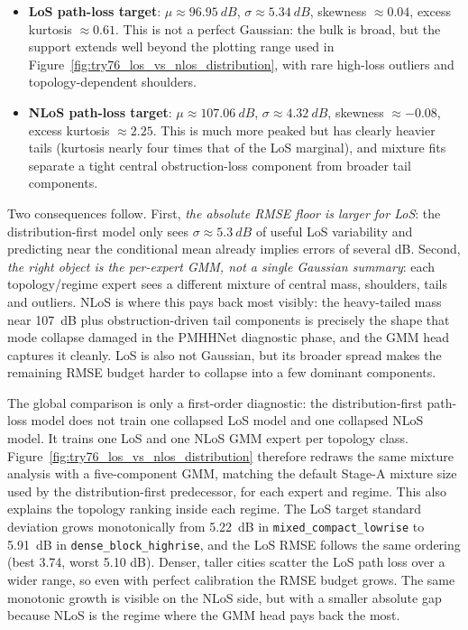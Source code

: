 \begin{itemize}
  \item \textbf{LoS path-loss target}: $\mu \approx \SI{96.95}{dB}$,
  $\sigma \approx \SI{5.34}{dB}$, skewness $\approx 0.04$, excess
  kurtosis $\approx 0.61$. This is not a perfect Gaussian: the bulk is
  broad, but the support extends well beyond the plotting range used in
  Figure~\ref{fig:try76_los_vs_nlos_distribution}, with rare high-loss
  outliers and topology-dependent shoulders.
  \item \textbf{NLoS path-loss target}: $\mu \approx \SI{107.06}{dB}$,
  $\sigma \approx \SI{4.32}{dB}$, skewness $\approx -0.08$, excess
  kurtosis $\approx 2.25$. This is much more peaked but has clearly
  heavier tails (kurtosis nearly four times that of the LoS marginal),
  and mixture fits separate a tight central obstruction-loss component
  from broader tail components.
\end{itemize}

Two consequences follow. First, \emph{the absolute RMSE floor is
larger for LoS}: the distribution-first model only sees $\sigma \approx \SI{5.3}{dB}$ of useful
LoS variability and predicting near the conditional mean already implies
errors of several dB. Second, \emph{the right object is the per-expert
GMM, not a single Gaussian summary}: each topology/regime expert sees a
different mixture of central mass, shoulders, tails and outliers.
NLoS is where this pays back most visibly: the heavy-tailed mass near
\SI{107}{dB} plus obstruction-driven tail components is precisely the
shape that mode collapse damaged in the PMHHNet diagnostic phase, and the GMM head
captures it cleanly. LoS is also not Gaussian, but its broader spread
makes the remaining RMSE budget harder to collapse into a few dominant
components.

The global comparison is only a first-order diagnostic: the distribution-first path-loss model does not
train one collapsed LoS model and one collapsed NLoS model. It trains
one LoS and one NLoS GMM expert per topology class. Figure~\ref{fig:try76_los_vs_nlos_distribution}
therefore redraws the same mixture analysis with a five-component GMM,
matching the default Stage-A mixture size used by the distribution-first predecessor, for each
expert and regime. This also explains the topology ranking
inside each regime. The LoS target standard deviation grows
monotonically from \SI{5.22}{dB} in
\texttt{mixed\_compact\_lowrise} to \SI{5.91}{dB} in
\texttt{dense\_block\_highrise}, and the LoS RMSE follows the same
ordering (best 3.74, worst 5.10 dB). Denser, taller cities scatter the
LoS path loss over a wider range, so even with perfect calibration the
RMSE budget grows. The same monotonic growth is visible on the NLoS
side, but with a smaller absolute gap because NLoS is the regime where
the GMM head pays back the most.

